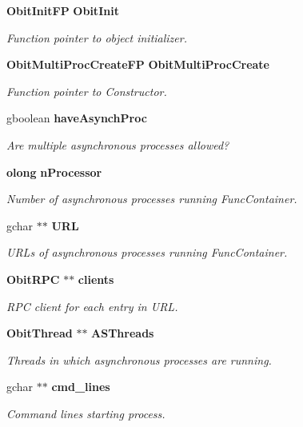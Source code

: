 \begin{CompactItemize}
{\bf Obit\-Init\-FP} {\bf Obit\-Init}
\begin{CompactList}\small\item\em Function pointer to object initializer. \item\end{CompactList}\item 
{\bf Obit\-Multi\-Proc\-Create\-FP} {\bf Obit\-Multi\-Proc\-Create}
\begin{CompactList}\small\item\em Function pointer to Constructor. \item\end{CompactList}\item 
gboolean {\bf have\-Asynch\-Proc}
\begin{CompactList}\small\item\em Are multiple asynchronous processes allowed? \item\end{CompactList}\item 
{\bf olong} {\bf n\-Processor}
\begin{CompactList}\small\item\em Number of asynchronous processes running Func\-Container. \item\end{CompactList}\item 
gchar $\ast$$\ast$ {\bf URL}
\begin{CompactList}\small\item\em URLs of asynchronous processes running Func\-Container. \item\end{CompactList}\item 
{\bf Obit\-RPC} $\ast$$\ast$ {\bf clients}
\begin{CompactList}\small\item\em RPC client for each entry in URL. \item\end{CompactList}\item 
{\bf Obit\-Thread} $\ast$$\ast$ {\bf ASThreads}
\begin{CompactList}\small\item\em Threads in which asynchronous processes are running. \item\end{CompactList}\item 
gchar $\ast$$\ast$ {\bf cmd\_\-lines}
\begin{CompactList}\small\item\em Command lines starting process. \item\end{CompactList}\end{CompactItemize}


